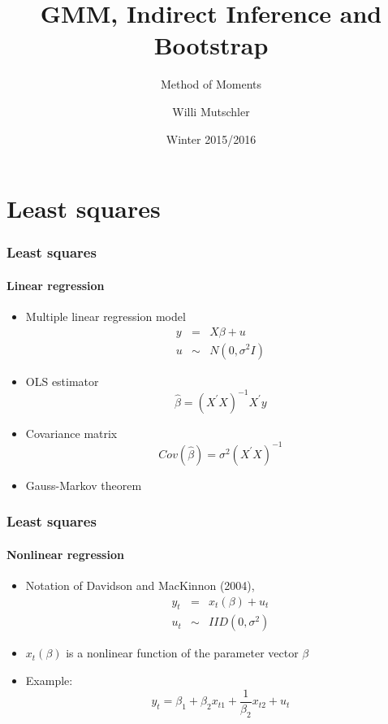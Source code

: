 \documentclass[notes=show]{beamer}
\begin{document}
\title{GMM, Indirect Inference and Bootstrap}
\subtitle{Method of Moments}
\author[Willi Mutschler]{Willi Mutschler}
\date{Winter 2015/2016}
\maketitle

\section{Least squares}

\begin{frame}\frametitle{Least squares}\framesubtitle{Linear regression}
\begin{itemize}
    \item Multiple linear regression model
    \begin{eqnarray*}
        y &=&X\beta +u \\
        u &\sim &N\left( 0,\sigma ^{2}I\right)
    \end{eqnarray*}
    \item OLS estimator
    \begin{equation*}
        \hat{\beta}=\left( X^{\prime }X\right) ^{-1}X^{\prime }y
    \end{equation*}
    \item Covariance matrix
    \begin{equation*}
        Cov\left( \hat{\beta}\right) =\sigma ^{2}\left( X^{\prime }X\right) ^{-1}
    \end{equation*}
    \item Gauss-Markov theorem
\end{itemize}
\end{frame}


\begin{frame}\frametitle{Least squares}\framesubtitle{Nonlinear regression}
\begin{itemize}
    \item Notation of Davidson and MacKinnon (2004),
    \begin{eqnarray*}
        y_{t} &=&x_{t}\left( \beta \right) +u_{t} \\
        u_{t} &\sim &IID(0,\sigma ^{2})
    \end{eqnarray*}
    \item $x_{t}(\beta )$ is a nonlinear function of the parameter vector $\beta$
    \item Example:
    \begin{equation*}
        y_{t}=\beta _{1}+\beta _{2}x_{t1}+\frac{1}{\beta _{2}}x_{t2}+u_{t}
    \end{equation*}
\end{itemize}
\end{frame}
\end{document}
